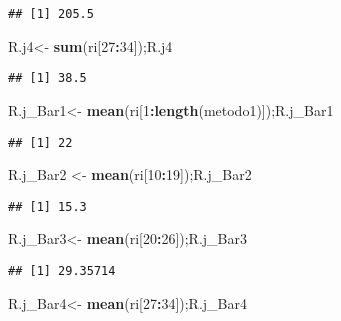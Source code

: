 \documentclass[
]{article}
\newenvironment{Shaded}{\begin{snugshade}}{\end{snugshade}}
\newcommand{\DecValTok}[1]{\textcolor[rgb]{0.00,0.00,0.81}{#1}}
\newcommand{\FunctionTok}[1]{\textcolor[rgb]{0.13,0.29,0.53}{\textbf{#1}}}
\newcommand{\NormalTok}[1]{#1}
\newcommand{\OtherTok}[1]{\textcolor[rgb]{0.56,0.35,0.01}{#1}}
\newcommand{\SpecialCharTok}[1]{\textcolor[rgb]{0.81,0.36,0.00}{\textbf{#1}}}
\begin{document}
\begin{verbatim}
## [1] 205.5
\end{verbatim}

\begin{Shaded}
\begin{Highlighting}[]
\NormalTok{R.j4}\OtherTok{\textless{}{-}} \FunctionTok{sum}\NormalTok{(ri[}\DecValTok{27}\SpecialCharTok{:}\DecValTok{34}\NormalTok{]);R.j4}
\end{Highlighting}
\end{Shaded}

\begin{verbatim}
## [1] 38.5
\end{verbatim}

\begin{Shaded}
\begin{Highlighting}[]
\NormalTok{R.j\_Bar1}\OtherTok{\textless{}{-}} \FunctionTok{mean}\NormalTok{(ri[}\DecValTok{1}\SpecialCharTok{:}\FunctionTok{length}\NormalTok{(metodo1)]);R.j\_Bar1}
\end{Highlighting}
\end{Shaded}

\begin{verbatim}
## [1] 22
\end{verbatim}

\begin{Shaded}
\begin{Highlighting}[]
\NormalTok{R.j\_Bar2 }\OtherTok{\textless{}{-}} \FunctionTok{mean}\NormalTok{(ri[}\DecValTok{10}\SpecialCharTok{:}\DecValTok{19}\NormalTok{]);R.j\_Bar2}
\end{Highlighting}
\end{Shaded}

\begin{verbatim}
## [1] 15.3
\end{verbatim}

\begin{Shaded}
\begin{Highlighting}[]
\NormalTok{R.j\_Bar3}\OtherTok{\textless{}{-}} \FunctionTok{mean}\NormalTok{(ri[}\DecValTok{20}\SpecialCharTok{:}\DecValTok{26}\NormalTok{]);R.j\_Bar3}
\end{Highlighting}
\end{Shaded}

\begin{verbatim}
## [1] 29.35714
\end{verbatim}

\begin{Shaded}
\begin{Highlighting}[]
\NormalTok{R.j\_Bar4}\OtherTok{\textless{}{-}} \FunctionTok{mean}\NormalTok{(ri[}\DecValTok{27}\SpecialCharTok{:}\DecValTok{34}\NormalTok{]);R.j\_Bar4}
\end{Highlighting}
\end{Shaded}
\end{document}
